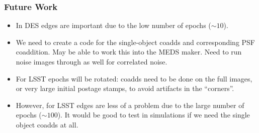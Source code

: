 \documentclass{beamer}
\begin{document}
\frame
{
    \frametitle{Future Work}

 
 
    \begin{itemize}

        \item In DES edges are important due to the low number of epochs
            ($\sim10$).

        \item We need to create a code for the single-object coadds and
            corresponding PSF coaddition.  May be able to work this into the
            MEDS maker.  Need to run noise images through as well for
            correlated noise.

        \item For LSST epochs will be rotated: coadds need to be done on the
            full images, or very large initial postage stamps,  to avoid
            artifacts in the ``corners''.

        \item However, for LSST edges are less of a problem due to the large
            number of epochs ($\sim 100$).  It would be good to test in
            simulations if we need the single object coadds at all.

    \end{itemize}

}
\end{document}
